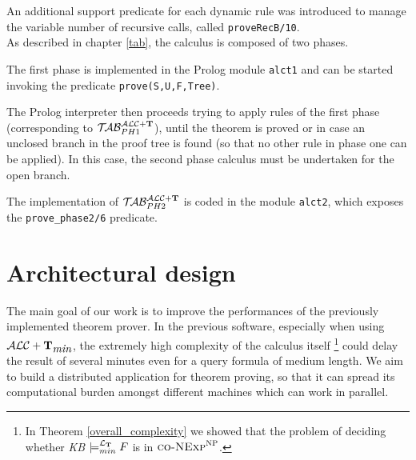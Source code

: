 \documentclass[a4paper, 11pt, oneside]{duthesis}
\newcommand{\tip}{{\bf T}}
\newcommand{\alctmin}{\mathcal{ALC}+\tip_{\mbox{\em min}}}
\newcommand{\ellet} {\mathcal{L}_{\bf T}}
\newcommand{\primo}{\mathrel{{\mathcal{T}\!\mathcal{AB}}}_{PH 1}^{\mathcal{ALC}+\mbox{\scriptsize $\tip$}}}
\newcommand{\secondo}{\mathrel{{\mathcal{T}\!\mathcal{AB}}}_{PH 2}^{\mathcal{ALC}+\mbox{\scriptsize $\tip$}}}
\begin{document}
\newpage

An additional support predicate for each dynamic rule was introduced to manage the variable number of recursive calls, called \texttt{proveRecB/10}.\\

As described in chapter \ref{tab}, the calculus is composed of two phases.

The first phase is implemented in the Prolog module \texttt{alct1} and can be started invoking the predicate \texttt{prove(S,U,F,Tree)}.

The Prolog interpreter then proceeds trying to apply rules of the first phase (corresponding to $\primo$), until the theorem is proved or in case an unclosed branch in the proof tree is found (so that no other rule in phase one can be applied). 
In this case, the second phase calculus must be undertaken for the open branch.

The implementation of $\secondo$ is coded in the module \texttt{alct2}, which exposes the \texttt{prove\_phase2/6} predicate.

\newpage




























\chapter{Architectural design}\label{arch}

The main goal of our work is to improve the performances of the previously implemented theorem prover.
In the previous software, especially when using $\alctmin$, the extremely high complexity of the calculus itself
\footnote{In Theorem \ref{overall_complexity} we showed that the problem of deciding whether \emph{KB} $\models_{min}^{\ellet} F$ is in $\textsc{co-NExp}^\textsc{NP}$.}
could delay the result of several minutes even for a query formula of medium length.
We aim to build a distributed application for theorem proving, so that it can spread its computational burden amongst different machines which can work in parallel.
\end{document}

